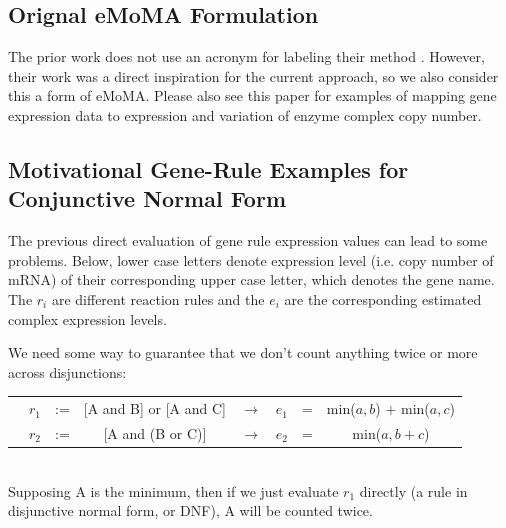 \documentclass[phd,tocprelim]{cornell}
\begin{document}
\vspace{5 mm} 


\subsection{Orignal eMoMA Formulation}

The prior work does not use an acronym for labeling their method \cite{Lee2012}.
However, their work was a direct inspiration for the current approach, 
so we also consider this a form of eMoMA. Please also see this paper for examples
of mapping gene expression data to expression and variation of enzyme complex
copy number.

\subsection{Motivational Gene-Rule Examples for Conjunctive Normal Form}
The previous direct evaluation of gene rule expression values can lead to some problems.
Below, lower case letters denote expression level (i.e. copy number of mRNA) of their
corresponding upper case letter, which denotes the gene name. The $r_i$ are different reaction
rules and the $e_i$ are the corresponding estimated complex expression levels.

We need some way to guarantee that we don’t count anything twice or more across disjunctions: \\
\begin{tabular}{cccccccc}
& $r_1$ & := & [A and B] or [A and C] & $\rightarrow$ & $e_1$  &=& min($a,b$) + min($a,c$) \\ 
& $r_2$ & := & [A and (B or C)]       & $\rightarrow$ & $e_2$  &=&  min($a, b + c$) 
\end{tabular} \\
Supposing A is the minimum, then if we just evaluate $r_1$ directly (a rule in 
disjunctive normal form, or DNF), A will be counted twice. 
\end{document}
